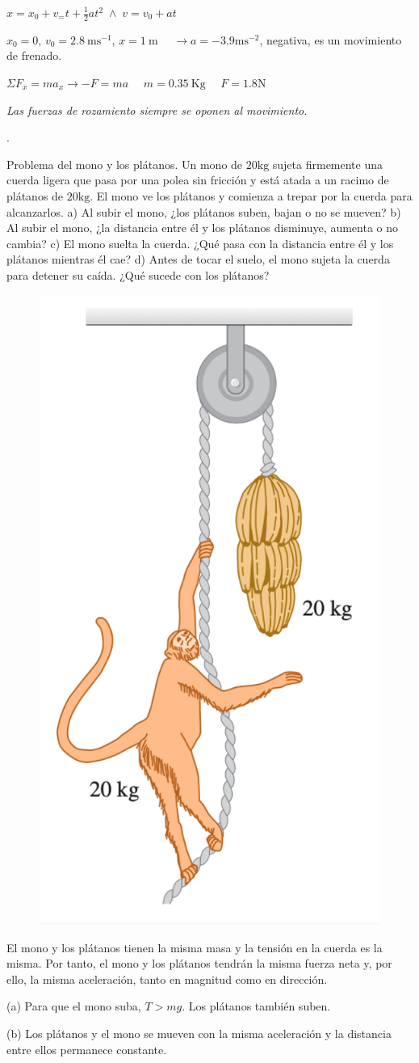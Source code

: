 $x=x_0+ v_= t + \frac 1 2 a t^2 \; \wedge \; v=v_0+a t$

$x_0=0$, $v_0=2.8\ \mathrm{m s}^{-1}$, $x=1\ \mathrm{m}$ $\quad \to a=-3.9 \mathrm{ms}^{-2}$, negativa, es un movimiento de frenado.

$\Sigma F_x=m a_x \to -F=ma $ $\quad m=0.35\ \mathrm{Kg}$ $\quad F=1.8 \mathrm{N}$

\emph{Las fuerzas de rozamiento siempre se oponen al movimiento.}

\begin{prob}.
\begin{multicols}{2}
Problema del mono y los plátanos. Un mono de $20 \mathrm{kg}$ sujeta firmemente una cuerda ligera que pasa por una polea sin fricción y está atada a un racimo de plátanos de $20 \mathrm{kg}$. El mono ve los plátanos y comienza a trepar por la cuerda para alcanzarlos. a) Al subir el mono, ¿los plátanos suben, bajan o no se mueven? b) Al subir el mono, ¿la distancia entre él y los plátanos disminuye, aumenta o no cambia? c) El mono suelta la cuerda. ¿Qué pasa con la distancia entre él y los plátanos mientras él cae? d) Antes de tocar el suelo, el mono sujeta la cuerda para detener su caída. ¿Qué sucede con los plátanos?
\begin{figure}[H]
	\centering
	\includegraphics[width=.25\textwidth]{imagenes/imagenes03/T03IM36.png}
	\end{figure}	
\end{multicols}	
\end{prob}

El mono y los plátanos tienen la misma masa y la tensión en la cuerda es la misma. Por tanto, el mono y los plátanos tendrán la misma fuerza neta y, por ello, la misma aceleración, tanto en magnitud como en dirección.

(a) Para que el mono suba, $T> mg$. Los plátanos también suben.

(b) Los plátanos y el mono se mueven con la misma aceleración y la distancia entre ellos permanece constante. 

